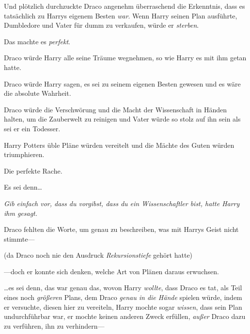 Und plötzlich durchzuckte Draco angenehm überraschend die Erkenntnis, dass es tatsächlich zu Harrys eigenem Besten \emph{war}. Wenn Harry seinen Plan ausführte, Dumbledore und Vater für dumm zu verkaufen, würde er \emph{sterben}.

Das machte es \emph{perfekt}.

Draco würde Harry alle seine Träume wegnehmen, so wie Harry es mit ihm getan hatte.

Draco würde Harry sagen, es sei zu seinem eigenen Besten gewesen und es wäre die absolute Wahrheit.

Draco würde die Verschwörung und die Macht der Wissenschaft in Händen halten, um die Zauberwelt zu reinigen und Vater würde so stolz auf ihn sein als sei er ein Todesser.

Harry Potters üble Pläne würden vereitelt und die Mächte des Guten würden triumphieren.

Die perfekte Rache.

Es sei denn…

\emph{Gib einfach vor, dass du vorgibst, dass du ein Wissenschaftler bist, hatte Harry ihm gesagt.}

Draco fehlten die Worte, um genau zu beschreiben, was mit Harrys Geist nicht stimmte—

(da Draco noch nie den Ausdruck \emph{Rekursionstiefe} gehört hatte)

—doch er konnte sich denken, welche Art von Plänen daraus erwuchsen.

…es sei denn, das war genau das, wovon Harry \emph{wollte}, dass Draco es tat, als Teil eines noch \emph{größeren} Plans, dem Draco \emph{genau in die Hände} spielen würde, indem er versuchte, diesen hier zu vereiteln, Harry mochte sogar \emph{wissen}, dass sein Plan undurchführbar war, er mochte keinen anderen Zweck erfüllen, \emph{außer} Draco dazu zu verführen, ihn zu verhindern—

